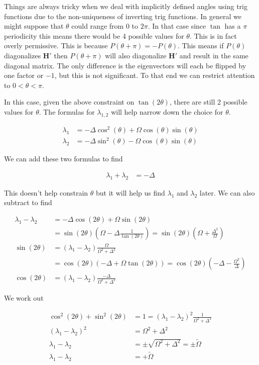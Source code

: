 \documentclass[12pt]{article}
\newcommand{\bv}[1]{\boldsymbol{#1}}
\begin{document}
Things are always tricky when we deal with implicitly defined angles using trig functions due to the non-uniqueness of inverting trig functions. In general we might suppose that $\theta$ could range from $0$ to $2\pi$. In that case since $\tan$ has a $\pi$ periodicity this means there would be 4 possible values for $\theta$. This is in fact overly permissive. This is because $P(\theta + \pi) = -P(\theta)$. This means if $P(\theta)$ diagonalizes $\bv{H}'$ then $P(\theta+\pi)$ will also diagonalize $\bv{H}'$ and result in the same diagonal matrix. The only difference is the eigenvectors will each be flipped by one factor or $-1$, but this is not significant. To that end we can restrict attention to $0<\theta<\pi$.

In this case, given the above constraint on $\tan(2\theta)$, there are still 2 possible values for $\theta$. The formulas for $\lambda_{1,2}$ will help narrow down the choice for $\theta$.

\begin{align}
\lambda_1 &= -\Delta \cos^2(\theta) + \Omega \cos(\theta)\sin(\theta)\\
\lambda_2 &= -\Delta \sin^2(\theta) - \Omega \cos(\theta)\sin(\theta)
\end{align}

We can add these two formulas to find

\begin{align}
\lambda_1 + \lambda_2 &= -\Delta
\end{align}

This doesn't help constrain $\theta$ but it will help us find $\lambda_1$ and $\lambda_2$ later. We can also subtract to find

\begin{align}
\lambda_1 - \lambda_2 &= -\Delta \cos(2\theta) + \Omega \sin(2\theta)\\
&= \sin(2\theta)\left(\Omega -\Delta \frac{1}{\tan(2\theta)} \right) = \sin(2\theta) \left(\Omega + \frac{\Delta^2}{\Omega} \right)\\
\sin(2\theta) &= (\lambda_1 - \lambda_2) \frac{\Omega}{\Omega^2 + \Delta^2}\\
&= \cos(2\theta)\left(-\Delta + \Omega \tan(2\theta)\right) = \cos(2\theta)\left(-\Delta -\frac{\Omega^2}{\Delta} \right)\\
\cos(2\theta) &= (\lambda_1-\lambda_2)\frac{-\Delta}{\Omega^2+\Delta^2}
\end{align}

We work out

\begin{align}
\cos^2(2\theta) + \sin^2(2\theta) &= 1 = (\lambda_1 - \lambda_2)^2 \frac{1}{\Omega^2 + \Delta^2}\\
(\lambda_1 - \lambda_2)^2 &= \Omega^2 + \Delta^2\\
\lambda_1 - \lambda_2 &= \pm \sqrt{\Omega^2 + \Delta^2} = \pm \tilde{\Omega}\\
\lambda_1 - \lambda_2 &= +\tilde{\Omega}
\end{align}
\end{document}
